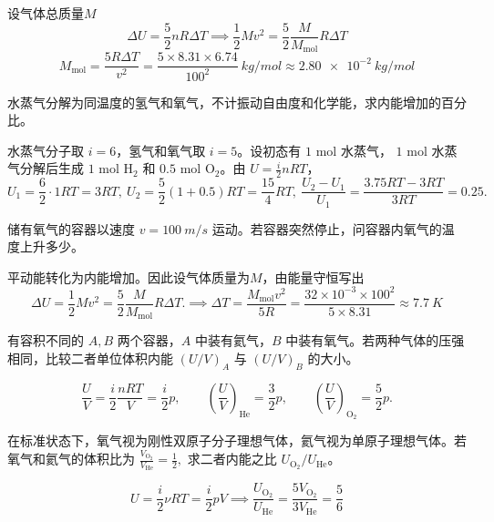 \begin{solution}
设气体总质量$M$\[\Delta U=\frac52 nR\Delta T\implies\frac12 Mv^2=\frac52\frac{M}{M_{\mathrm{mol}}}R\Delta T\]
 \[M_{\mathrm{mol}} =\frac{5R\Delta T}{v^2} =\frac{5\times 8.31\times 6.74}{100^2}\ \si{kg/mol} \approx \SI{2.80e-2}{kg/mol}\]
\end{solution}

\begin{exercise}[水蒸气分解为同温氢气和氧气时内能增加多少]
水蒸气分解为同温度的氢气和氧气，不计振动自由度和化学能，求内能增加的百分比。
\end{exercise}

\begin{solution}
水蒸气分子取 \(i=6\)，氢气和氧气取 \(i=5\)。设初态有 \(1\) mol 水蒸气， \(1\) mol 水蒸气分解后生成 \(1\) mol \(\mathrm{H_2}\) 和 \(0.5\) mol \(\mathrm{O_2}\)。由 \(U=\frac{i}{2}nRT\)，
 \[U_1=\frac{6}{2}\cdot1RT=3RT,~ U_2=\frac{5}{2}(1+0.5)RT=\frac{15}{4}RT,~\frac{U_2-U_1}{U_1} =\frac{3.75RT-3RT}{3RT} =0.25.\] 
\end{solution}

\begin{exercise}[容器骤停后温升为什么先看整体平动动能去哪了]
储有氧气的容器以速度 \(v=\SI{100}{m/s}\) 运动。若容器突然停止，问容器内氧气的温度上升多少。
\end{exercise}

\begin{solution}
平动能转化为内能增加。因此设气体质量为$M$，由能量守恒写出
 \[\Delta U=\frac12 Mv^2=\frac52 \frac{M}{M_{\mathrm{mol}}}R\Delta T. \implies \Delta T=\frac{M_{\mathrm{mol}}v^2}{5R}=\frac{32\times10^{-3}\times 100^2}{5\times 8.31}\approx \SI{7.7}{K}\]
\end{solution}


\begin{exercise}
有容积不同的 \(A,B\) 两个容器，\(A\) 中装有氦气，\(B\) 中装有氧气。若两种气体的压强相同，比较二者单位体积内能 \((U/V)_A\) 与 \((U/V)_B\) 的大小。
\end{exercise}

\begin{solution}
 \[\frac{U}{V}=\frac{i}{2}\frac{nRT}{V}=\frac{i}{2}p,\qquad \left(\frac{U}{V}\right)_{\mathrm{He}}=\frac32p,\qquad \left(\frac{U}{V}\right)_{\mathrm{O_2}}=\frac52p.\]
\end{solution}

\begin{exercise}
在标准状态下，氧气视为刚性双原子分子理想气体，氦气视为单原子理想气体。若氧气和氦气的体积比为
 \(\frac{V_{\mathrm{O_2}}}{V_{\mathrm{He}}}=\frac12,\) 
求二者内能之比 \(U_{\mathrm{O_2}}/U_{\mathrm{He}}\)。
\end{exercise}
\begin{solution}
 \[U=\frac{i}{2}\nu RT=\frac{i}{2}pV \implies \frac{U_{\mathrm{O_2}}}{U_{\mathrm{He}}}=\frac{5V_{\mathrm{O_2}}}{3V_{\mathrm{He}}} =\frac56\]
\end{solution}
